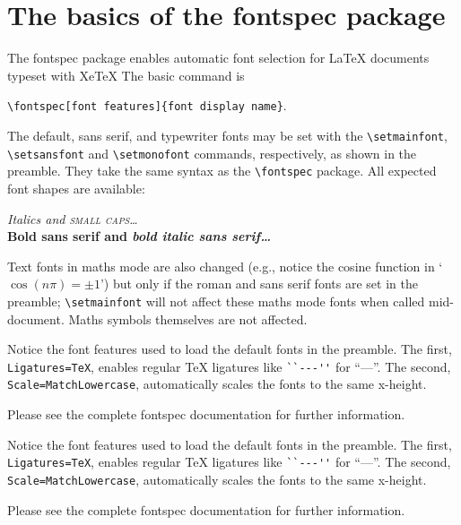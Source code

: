 \documentclass{article}
\begin{document}
\pagestyle{empty}

\section*{The basics of the \textsf{fontspec} package}

The \textsf{fontspec} package enables automatic font selection
for \LaTeX{} documents typeset with Xe\TeX{} 
The basic command is

{\centering \verb|\fontspec[font features]{font display name}|.\par}

The default, sans serif, and typewriter fonts may be set with the
\verb|\setmainfont|, \verb|\setsansfont| and \verb|\setmonofont|
commands, respectively, as shown in the preamble. They take the
same syntax as the \verb|\fontspec| package. All expected font
shapes are available:

\begin{center}
  {\itshape Italics and \scshape small caps\dots}\\
  {\sffamily\bfseries Bold sans serif and \itshape bold italic sans serif\dots}
\end{center}

Text fonts in maths mode are also changed (e.g., notice the cosine function in
`$\cos(n\pi)=\pm 1$') but only if the roman and sans serif fonts are set in
the preamble; \verb|\setmainfont| will not affect these maths mode fonts when
called mid-document.
Maths symbols themselves are not affected.

Notice the font features used to load the default fonts in the preamble.
The first, \verb|Ligatures=TeX|, enables regular \TeX{} ligatures like
\verb|``---''| for ``---''.
The second, \verb|Scale=MatchLowercase|, automatically scales the fonts to
the same x-height.

Please see the complete \textsf{fontspec} documentation for further
information.

\setmainfont[
    Ligatures=TeX,
    Extension=.otf,
    UprightFont= *-Regular,
    BoldFont=*-Bold,
    ItalicFont=*-Italic,
    BoldItalicFont=*-BoldItalic]{KurierCond}

Notice the font features used to load the default fonts in the preamble.
The first, \verb|Ligatures=TeX|, enables regular \TeX{} ligatures like
\verb|``---''| for ``---''.
The second, \verb|Scale=MatchLowercase|, automatically scales the fonts to
the same x-height.

Please see the complete \textsf{fontspec} documentation for further
information.
\end{document}
